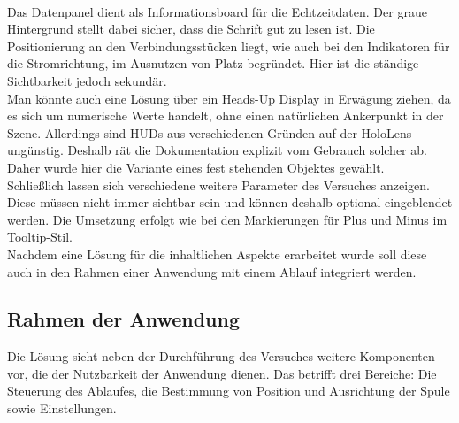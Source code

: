 \vspace{8px}
\begin{center}
	\\
\end{center}
\vspace{6px}

Das Datenpanel dient als Informationsboard für die Echtzeitdaten. Der graue Hintergrund stellt dabei sicher, dass die Schrift gut zu lesen ist. Die Positionierung an den Verbindungsstücken liegt, wie auch bei den Indikatoren für die Stromrichtung, im Ausnutzen von Platz begründet. Hier ist die ständige Sichtbarkeit jedoch sekundär.\\

Man könnte auch eine Lösung über ein Heads-Up Display in Erwägung ziehen, da es sich um numerische Werte handelt, ohne einen natürlichen Ankerpunkt in der Szene. Allerdings sind HUDs aus verschiedenen Gründen auf der HoloLens ungünstig. Deshalb rät die Dokumentation explizit vom Gebrauch solcher ab. Daher wurde hier die Variante eines fest stehenden Objektes gewählt.\\

Schließlich lassen sich verschiedene weitere Parameter des Versuches anzeigen. Diese müssen nicht immer sichtbar sein und können deshalb optional eingeblendet werden. Die Umsetzung erfolgt wie bei den Markierungen für Plus und Minus im Tooltip-Stil.\\

Nachdem eine Lösung für die inhaltlichen Aspekte erarbeitet wurde soll diese auch in den Rahmen einer Anwendung mit einem Ablauf integriert werden.

\subsection{Rahmen der Anwendung}
\label{sec-4-3}
Die Lösung sieht neben der Durchführung des Versuches weitere Komponenten vor, die der Nutzbarkeit der Anwendung dienen. Das betrifft drei Bereiche: Die Steuerung des Ablaufes, die Bestimmung von Position und Ausrichtung der Spule sowie Einstellungen.

